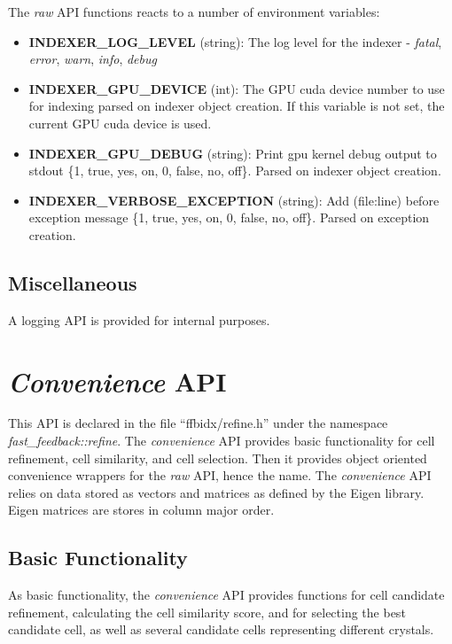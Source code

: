 \documentclass[a4paper,10pt]{article}
\begin{document}
The \emph{raw} API functions reacts to a number of environment variables:
%
\begin{itemize}
 \item \textbf{INDEXER\_LOG\_LEVEL} (string): The log level for the indexer - \emph{fatal}, \emph{error}, \emph{warn}, \emph{info}, \emph{debug}
 \item \textbf{INDEXER\_GPU\_DEVICE} (int): The GPU cuda device number to use for indexing parsed on indexer object creation. If this variable is not set, the current GPU cuda device is used.
 \item \textbf{INDEXER\_GPU\_DEBUG} (string): Print gpu kernel debug output to stdout \{1, true, yes, on, 0, false, no, off\}. Parsed on indexer object creation.
 \item \textbf{INDEXER\_VERBOSE\_EXCEPTION} (string): Add (file:line) before exception message \{1, true, yes, on, 0, false, no, off\}. Parsed on exception creation.
\end{itemize}

\subsection{Miscellaneous}

A logging API is provided for internal purposes.

\section{\emph{Convenience} API}

This API is declared in the file ``ffbidx/refine.h'' under the namespace \emph{fast\_feed\-back::re\-fine}. The \emph{convenience} API provides basic functionality for cell refinement, cell similarity, and cell selection. Then it provides object oriented convenience wrappers for the \emph{raw} API, hence the name. The \emph{convenience} API relies on data stored as vectors and matrices as defined by the Eigen library. Eigen matrices are stores in column major order.

\subsection{Basic Functionality}

As basic functionality, the \emph{convenience} API provides functions for cell candidate refinement, calculating the cell similarity score, and for selecting the best candidate cell, as well as several candidate cells representing different crystals.
\end{document}
